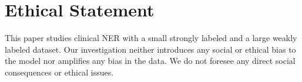 \documentclass[letterpaper]{article} %
\begin{document}
\section{Ethical Statement}
\label{ethics}
%
This paper studies clinical NER with a small strongly labeled and a large weakly labeled dataset.
Our investigation neither introduces any social or ethical bias to the model nor amplifies any bias in the data.
We do not foresee any direct social consequences or ethical issues.
%
\end{document}
